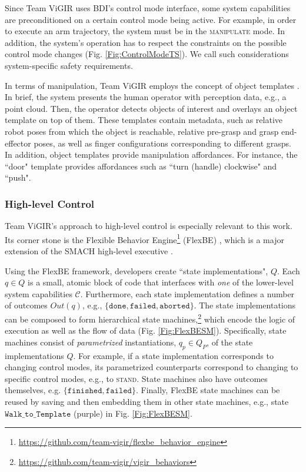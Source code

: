 Since Team ViGIR uses BDI's control mode interface, some system capabilities are preconditioned on a certain control mode being active.
For example, in order to execute an arm trajectory, the system must be in the \textsc{manipulate} mode.
In addition, the system's operation has to respect the constraints on the possible control mode changes (Fig. \ref{Fig:ControlModeTS}).
We call such considerations system-specific safety requirements.

In terms of manipulation, Team ViGIR employs the concept of object templates \cite{Alberto2014Humanoids}.
In brief, the system presents the human operator with perception data, e.g., a point cloud.
Then, the operator detects objects of interest and overlays an object template on top of them.
These templates contain metadata, such as relative robot poses from which the object is reachable, relative pre-grasp and grasp end-effector poses, as well as finger configurations corresponding to different grasps.
In addition, object templates provide manipulation affordances.
For instance, the ``door" template provides affordances such as ``turn (handle) clockwise" and ``push".

\subsubsection*{High-level Control}\label{S:FlexBE}
Team ViGIR's approach to high-level control is especially relevant to this work.
Its corner stone is the Flexible Behavior Engine\footnote{\scriptsize{\url{https://github.com/team-vigir/flexbe_behavior_engine}}} (FlexBE) \cite{Philipp2013Bsc, Philipp2015MSc}, which is a major extension of the SMACH high-level executive \cite{SMACH2010RAM}.

Using the FlexBE framework, developers create ``state implementations", $Q$. %
Each $q \in Q$ is a small, atomic block of code that interfaces with \emph{one} of the lower-level system capabilities $\mathcal{C}$.
Furthermore, each state implementation defines a number of outcomes $Out(q)$, e.g., $\{ \mathtt{done}, \mathtt{failed}, \mathtt{aborted} \}$.
The state implementations can be composed to form hierarchical state machines,\footnote{\scriptsize{\url{https://github.com/team-vigir/vigir_behaviors}}}
 which encode the logic of execution as well as the flow of data (Fig. \ref{Fig:FlexBESM}).
Specifically, state machines consist of \emph{parametrized} instantiations, $q_p \in Q_P$, of the state implementations $Q$.
For example, if a state implementation corresponds to changing control modes, its parametrized counterparts correspond to changing to specific control modes, e.g., to \textsc{stand}.
State machines also have outcomes themselves, e.g. $\{ \mathtt{finished}, \mathtt{failed} \}$.
Finally, FlexBE state machines can be reused by saving and then embedding them in other state machines, e.g., state $\mathtt{Walk\_to\_Template}$ (purple) in Fig. \ref{Fig:FlexBESM}.

